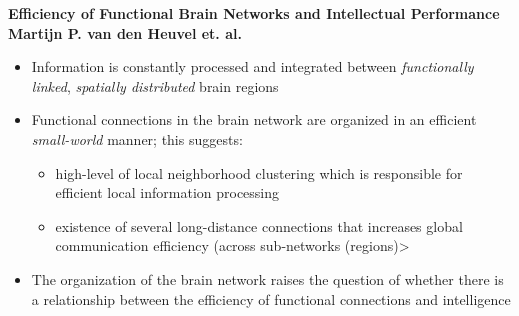 \documentclass[11pt, letterpaper]{article}
\begin{document}
\begin{center}
    \large\textbf{Efficiency of Functional Brain Networks and Intellectual Performance\\
                  Martijn P. van den Heuvel et. al.}
\end{center}

\begin{itemize}
    \setlength\itemsep{0.05em}
    
    \item {Information is constantly processed and integrated between \textit{functionally linked},
           \textit{spatially distributed} brain regions}
    \item {
        Functional connections in the brain network are organized in an efficient \textit{small-world} manner; 
        this suggests:
        \begin{itemize}
            \setlength\itemsep{0.05em}
            \item high-level of local neighborhood clustering which is responsible for efficient local information processing
            \item existence of several long-distance connections that increases global communication efficiency (across sub-networks (regions)>
        \end{itemize}
    }
    \item {The organization of the brain network raises the question of whether there is a relationship between
           the efficiency of functional connections and intelligence}
    
\end{itemize}
\end{document}
